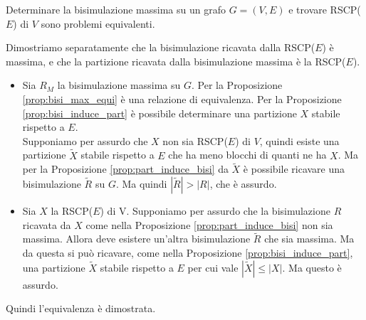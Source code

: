 \begin{corollary}
    Determinare la bisimulazione massima su un grafo $G = (V,E)$ e trovare RSCP($E$) di $V$ sono problemi equivalenti.
\end{corollary}
\begin{proof2}
    Dimostriamo separatamente che la bisimulazione ricavata dalla RSCP($E$) è massima, e che la partizione ricavata dalla bisimulazione massima è la RSCP($E$).
    \begin{itemize}
        \item Sia $R_M$ la bisimulazione massima su $G$. Per la Proposizione \ref{prop:bisi_max_equi} è una relazione di equivalenza. Per la Proposizione \ref{prop:bisi_induce_part} è possibile determinare una partizione $X$ stabile rispetto a $E$.\\
              Supponiamo per assurdo che $X$ non sia RSCP($E$) di $V$, quindi esiste una partizione $\widetilde{X}$ stabile rispetto a $E$ che ha meno blocchi di quanti ne ha $X$. Ma per la Proposizione \ref{prop:part_induce_bisi} da
              $\widetilde{X}$ è possibile ricavare una bisimulazione $\widetilde{R}$ su $G$. Ma quindi $|\widetilde{R}| > |R|$, che è assurdo.
        \item Sia $X$ la RSCP($E$) di V. Supponiamo per assurdo che la bisimulazione $R$ ricavata da $X$ come nella Proposizione \ref{prop:part_induce_bisi} non sia massima. Allora deve esistere un'altra bisimulazione $\widetilde{R}$ che
              sia massima. Ma da questa si può ricavare, come nella Proposizione \ref{prop:bisi_induce_part}, una partizione $\widetilde{X}$ stabile rispetto a $E$ per cui vale $|\widetilde{X}| \leq |X|$. Ma questo è assurdo.
    \end{itemize}
    Quindi l'equivalenza è dimostrata.
\end{proof2}
